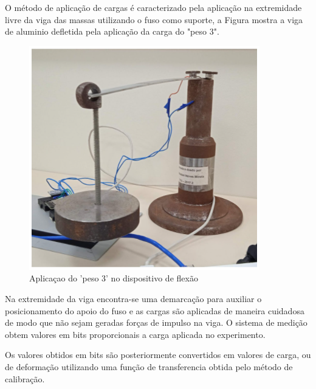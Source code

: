 O método de aplicação de cargas é caracterizado pela aplicação na extremidade livre da viga das massas utilizando o fuso como suporte, a Figura mostra a viga de aluminio defletida pela aplicação da carga do "peso 3".

\begin{figure}[htb]
	\caption{\label{fig:2080} Aplicaçao do 'peso 3' no dispositivo de flexão}
	\begin{center}
		\includegraphics[width=\textwidth]{pictures/2080.png}
	\end{center}
\end{figure}

Na extremidade da viga encontra-se uma demarcação para auxiliar o posicionamento do apoio do fuso e as cargas são aplicadas de maneira cuidadosa de modo que não sejam geradas forças de impulso na viga.
O sistema de medição obtem valores em bits proporcionais a carga aplicada no experimento.

Os valores obtidos em bits são posteriormente convertidos em valores de carga, ou de deformação utilizando uma função de transferencia obtida pelo método de calibração.
